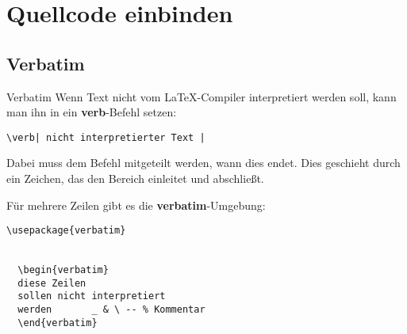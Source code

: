 \section{Quellcode einbinden}

\subsection{Verbatim}
\begin{frame}[fragile]{Verbatim}
Wenn Text nicht vom \LaTeX-Compiler interpretiert werden soll, kann man ihn in ein \textbf{verb}-Befehl setzen:

\begin{lstlisting}[style=tex]
\verb| nicht interpretierter Text |
\end{lstlisting}
Dabei muss dem Befehl mitgeteilt werden, wann dies endet. Dies geschieht durch ein Zeichen, das den Bereich einleitet und abschlie{\ss}t.

\vspace{2ex}
Für mehrere Zeilen gibt es die \textbf{verbatim}-Umgebung:

\begin{lstlisting}[style=tex]
\usepackage{verbatim}


  \begin{verbatim}
  diese Zeilen
  sollen nicht interpretiert
  werden       _ & \ -- % Kommentar
  \end{verbatim}

\end{lstlisting}
\end{frame}

